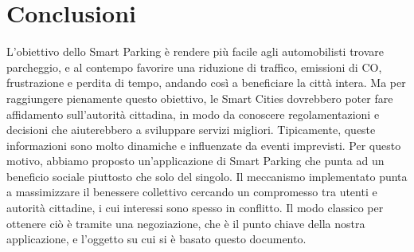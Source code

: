 \documentclass[11pt,a4paper,twoside]{article}
\numberwithin{figure}{section}
\numberwithin{equation}{section}
\begin{document}
\section{Conclusioni}

L'obiettivo dello Smart Parking è rendere più facile agli automobilisti trovare parcheggio, e al contempo favorire una riduzione di traffico, emissioni di CO, frustrazione e perdita di tempo, andando così a beneficiare la città intera.
Ma per raggiungere pienamente questo obiettivo, le Smart Cities dovrebbero poter fare affidamento sull'autorità cittadina, in modo da conoscere regolamentazioni e decisioni che aiuterebbero a sviluppare servizi migliori.
Tipicamente, queste informazioni sono molto dinamiche e influenzate da eventi imprevisti.
Per questo motivo, abbiamo proposto un'applicazione di Smart Parking che punta ad un beneficio sociale piuttosto che solo del singolo.
Il meccanismo implementato punta a massimizzare il benessere collettivo cercando un compromesso tra utenti e autorità cittadine, i cui interessi sono spesso in conflitto.
Il modo classico per ottenere ciò è tramite una negoziazione, che è il punto chiave della nostra applicazione, e l'oggetto su cui si è basato questo documento.

\nocite{*}

\renewcommand\refname{Riferimenti}

\end{document}
